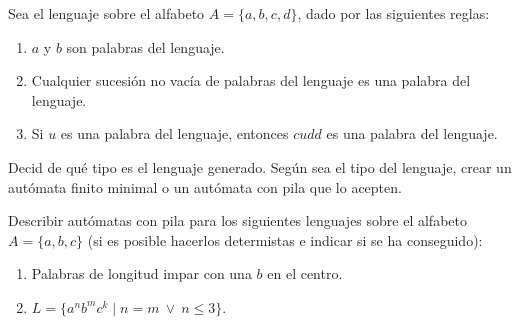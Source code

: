 \begin{ejercicio}\label{ej:1.5.22}
    Sea el lenguaje sobre el alfabeto $A = \{a,b,c,d\}$, dado por las siguientes reglas:
    \begin{enumerate}
        \item $a$ y $b$ son palabras del lenguaje.
        \item Cualquier sucesión no vacía de palabras del lenguaje es una palabra del lenguaje.
        \item Si $u$ es una palabra del lenguaje, entonces $cudd$ es una palabra del lenguaje.
    \end{enumerate}
    Decid de qué tipo es el lenguaje generado. Según sea el tipo del lenguaje, crear un autómata finito minimal o un autómata con pila que lo acepten.

\end{ejercicio}

\begin{ejercicio}\label{ej:1.5.23}
    Describir autómatas con pila para los siguientes lenguajes sobre el alfabeto $A = \{a,b,c\}$ (si es posible hacerlos determistas e indicar si se ha conseguido):
    \begin{enumerate}
        \item Palabras de longitud impar con una $b$ en el centro.
        \item $L = \{a^n b^m c^k \mid n = m\ \lor\ n \leq 3\}$.
    \end{enumerate}

\end{ejercicio}

